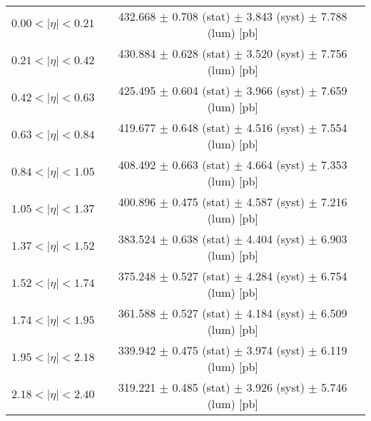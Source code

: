 \begin{tabular}{lc}
\hline
$0.00 < |\eta| <0.21$          & 432.668 $\pm$ 0.708 (stat) $\pm$ 3.843 (syst) $\pm$ 7.788 (lum) [pb]  \\
$0.21 < |\eta| <0.42$          & 430.884 $\pm$ 0.628 (stat) $\pm$ 3.520 (syst) $\pm$ 7.756 (lum) [pb]  \\
$0.42 < |\eta| <0.63$          & 425.495 $\pm$ 0.604 (stat) $\pm$ 3.966 (syst) $\pm$ 7.659 (lum) [pb]  \\
$0.63 < |\eta| <0.84$          & 419.677 $\pm$ 0.648 (stat) $\pm$ 4.516 (syst) $\pm$ 7.554 (lum) [pb]  \\
$0.84 < |\eta| <1.05$          & 408.492 $\pm$ 0.663 (stat) $\pm$ 4.664 (syst) $\pm$ 7.353 (lum) [pb]  \\
$1.05 < |\eta| <1.37$          & 400.896 $\pm$ 0.475 (stat) $\pm$ 4.587 (syst) $\pm$ 7.216 (lum) [pb]  \\
$1.37 < |\eta| <1.52$          & 383.524 $\pm$ 0.638 (stat) $\pm$ 4.404 (syst) $\pm$ 6.903 (lum) [pb]  \\
$1.52 < |\eta| <1.74$          & 375.248 $\pm$ 0.527 (stat) $\pm$ 4.284 (syst) $\pm$ 6.754 (lum) [pb]  \\
$1.74 < |\eta| <1.95$          & 361.588 $\pm$ 0.527 (stat) $\pm$ 4.184 (syst) $\pm$ 6.509 (lum) [pb]  \\
$1.95 < |\eta| <2.18$          & 339.942 $\pm$ 0.475 (stat) $\pm$ 3.974 (syst) $\pm$ 6.119 (lum) [pb]  \\
$2.18 < |\eta| <2.40$          & 319.221 $\pm$ 0.485 (stat) $\pm$ 3.926 (syst) $\pm$ 5.746 (lum) [pb]  \\
\hline
\end{tabular}
